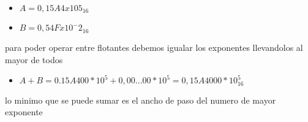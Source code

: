 \begin{itemize}    
  \item $A = 0,15A4 x 105_{16}$
  \item $B = 0,54F x 10^-2_{16}$
\end{itemize}

para poder operar entre flotantes debemos igualar los exponentes llevandolos al mayor de todos
\begin{itemize}    
  \item $A+B = 0.15A400 * 10^5 + 0,00...00 * 10^5 = 0,15A4000 * 10^5 _{16}$
\end{itemize}
lo minimo que se puede sumar es el ancho de paso del numero de mayor exponente